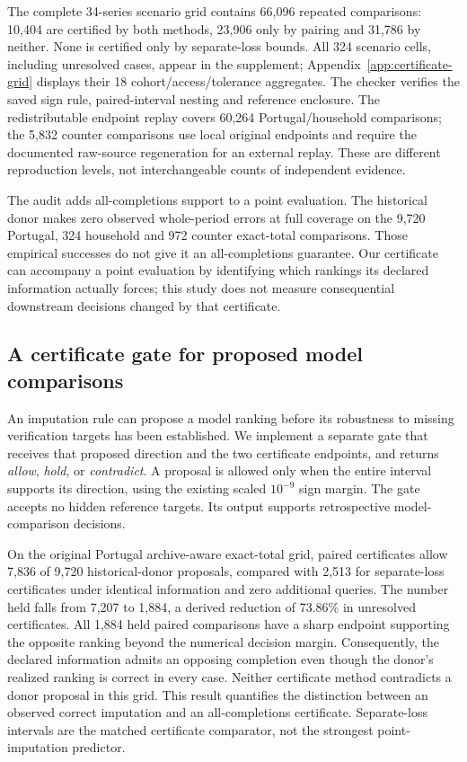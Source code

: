 The complete 34-series scenario grid contains 66,096 repeated comparisons:
10,404 are certified by both methods, 23,906 only by pairing and 31,786
by neither. None is certified only by separate-loss bounds. All 324
scenario cells, including unresolved cases, appear in the supplement;
Appendix~\ref{app:certificate-grid} displays their 18 cohort/access/tolerance
aggregates. The checker verifies the saved sign
rule, paired-interval nesting and reference enclosure. The redistributable
endpoint replay covers 60,264 Portugal/household comparisons; the 5,832
counter comparisons use local original endpoints and require the documented
raw-source regeneration for an external replay. These are different
reproduction levels, not interchangeable counts of independent evidence.

The audit adds all-completions support to a point evaluation. The historical
donor makes zero observed
whole-period errors at full coverage on the 9,720 Portugal, 324 household
and 972 counter exact-total comparisons. Those empirical successes do not
give it an all-completions guarantee. Our certificate can accompany a point
evaluation by identifying which rankings its declared information actually
forces; this study does not measure consequential downstream decisions
changed by that certificate.

\subsection{A certificate gate for proposed model comparisons}
\label{sec:practical_gate}
An imputation rule can propose a model ranking before its robustness to
missing verification targets has been established. We implement a separate
gate that receives that proposed direction and the two certificate endpoints,
and returns \emph{allow}, \emph{hold}, or \emph{contradict}. A proposal is allowed
only when the entire interval supports its direction, using the existing
scaled $10^{-9}$ sign margin. The gate accepts no hidden reference targets.
Its output supports retrospective model-comparison decisions.

On the original Portugal archive-aware exact-total grid, paired certificates
allow 7,836 of 9,720 historical-donor proposals, compared with 2,513 for
separate-loss certificates under identical information and zero additional
queries. The number held falls from 7,207 to 1,884, a derived reduction of
73.86\% in unresolved certificates. All 1,884 held paired comparisons have a
sharp endpoint supporting the opposite ranking beyond the numerical decision
margin. Consequently, the declared information admits an opposing completion
even though the donor's realized ranking is correct in every case. Neither
certificate method contradicts a donor proposal in this grid. This result
quantifies the distinction between an observed correct imputation and an
all-completions certificate. Separate-loss intervals are the matched
certificate comparator, not the strongest point-imputation predictor.

